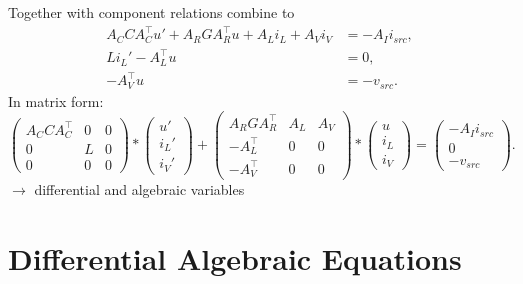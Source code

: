 	\begin{frame}
		\vfill
		Together with component relations combine to 
		\begin{displaymath}
			\begin{aligned}
				A_C C A_C^\top u' + A_R G A_R^\top u + A_L i_L + A_V i_V &= - A_I i_{src} , \\
				L i_L'	- A_L^\top u &= 0 , \\
				-A_V^\top u &=  -v_{src}.
			\end{aligned}	
		\end{displaymath}
		In matrix form:
		\begin{equation}
			\label{MNA_Matrixform}
			\begin{pmatrix}
				A_C C A_C^\top & 0 & 0 \\
				0 & L & 0 \\
				0 & 0 & 0
			\end{pmatrix}
			*
			\begin{pmatrix}
				u' \\
				i_L' \\
				i_V'
			\end{pmatrix}
			+
			\begin{pmatrix}
				A_R G A_R^\top & A_L & A_V \\
				-A_L^\top & 0 & 0 \\
				-A_V^\top & 0 & 0 
			\end{pmatrix}
			*
			\begin{pmatrix}
				u \\
				i_L \\
				i_V
			\end{pmatrix}
			=
			\begin{pmatrix}
				-A_I i_{src} \\
				0 \\
				-v_{src}
			\end{pmatrix} . 
		\end{equation}
		$\to$ differential and algebraic variables
		\vfill
	\end{frame}

\section*{Differential Algebraic Equations}
